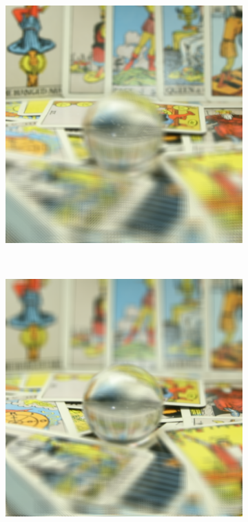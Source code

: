 \documentclass[11pt,a4paper,titlepage]{article}
\begin{document}
\begin{figure}
\begin{subfigure}[t]{0.19\textwidth}
	\end{subfigure}%
	\\\quad
	\begin{subfigure}[t]{0.19\textwidth}
		\includegraphics[width=\textwidth]{results/tarot_back_projection/sensorPlaneZ=-3/Back_Projection_layer_1.png} 
	\end{subfigure}%
	~
	\begin{subfigure}[t]{0.19\textwidth}
		\includegraphics[width=\textwidth]{results/tarot_back_projection/sensorPlaneZ=-3/Back_Projection_layer_2.png} 

\end{subfigure}
\end{figure}
\end{document}
